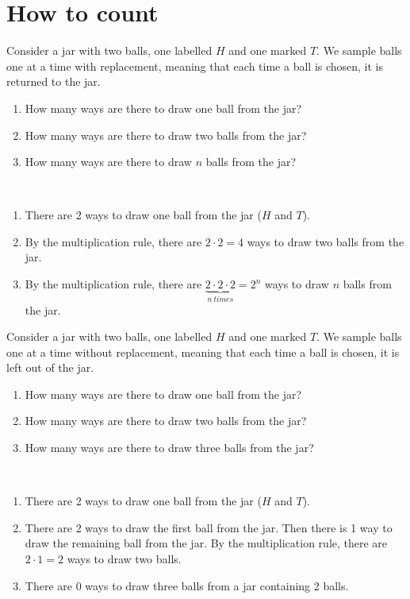 \section{How to count}
\label{sec:section-1.2}	 
	 
	\begin{exercise}
		Consider a jar with two balls, one labelled $H$ and one marked $T$. We sample balls one at a time with replacement, meaning that each time a ball is chosen, it is returned to the jar.
		\begin{enumerate}
			\item How many ways are there to draw one ball from the jar?
			\item How many ways are there to draw two balls from the jar?
			\item How many ways are there to draw $n$ balls from the jar?
		\end{enumerate}
		\begin{solution}~
			\begin{enumerate}
				\item There are 2 ways to draw one ball from the jar ($H$ and $T$).
				\item By the multiplication rule, there are $2 \cdot 2 = 4$ ways to draw two balls from the jar.
				\item By the multiplication rule, there are $\underbrace{2 \cdot 2 \cdot 2}_{n \: times} = 2^n$ ways to draw $n$ balls from the jar.
			\end{enumerate}
		\end{solution}
	\end{exercise}
	
	
	\begin{exercise}
		Consider a jar with two balls, one labelled $H$ and one marked $T$. We sample balls one at a time without replacement, meaning that each time a ball is chosen, it is left out of the jar.
		\begin{enumerate}
			\item How many ways are there to draw one ball from the jar?
			\item How many ways are there to draw two balls from the jar?
			\item How many ways are there to draw three balls from the jar?
		\end{enumerate}
		\begin{solution}~
			\begin{enumerate}
				\item There are 2 ways to draw one ball from the jar ($H$ and $T$).
				\item There are 2 ways to draw the first ball from the jar. Then there is 1 way to draw the remaining ball from the jar. By the multiplication rule, there are $2 \cdot 1 = 2$ ways to draw two balls.
				\item There are 0 ways to draw three balls from a jar containing 2 balls.
			\end{enumerate}
		\end{solution}
	\end{exercise}
	
